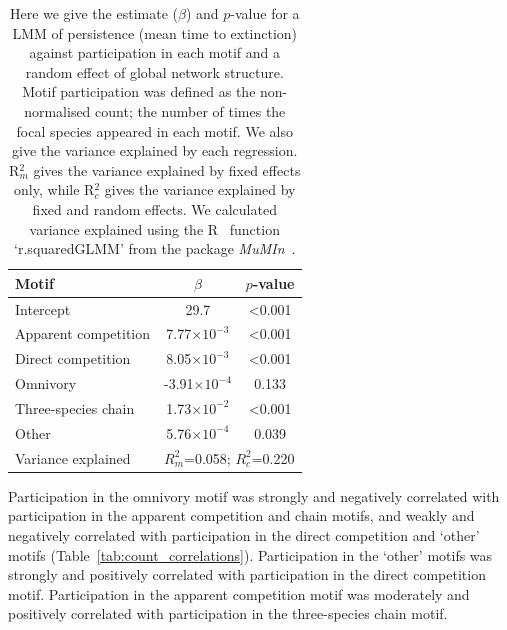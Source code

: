 \documentclass[12pt]{article}
\begin{document}
		\begin{table}[hb!]
    		\caption{Here we give the estimate ($\beta$) and $p$-value for a LMM of persistence (mean time to extinction) against participation in each motif and a random effect of global network structure. Motif participation was defined as the non-normalised count; the number of times the focal species appeared in each motif. We also give the variance explained by each regression. R$^{2}_{m}$ gives the variance explained by fixed effects only, while R$^{2}_{c}$ gives the variance explained by fixed and random effects. We calculated variance explained using the R~\citep{R} function `r.squaredGLMM' from the package \emph{MuMIn}~\citep{MuMIn}.}
    		\label{tab:persistence_motifs}
    		\begin{tabular}{l | c c}
    		 Motif & $\beta$ & $p$-value \\  
    		 \hline
    		 Intercept & 29.7 & \textless0.001 \\
    		 \hline
    		 Apparent competition & 7.77$\times10^{-3}$ & \textless0.001 \\
    		 Direct competition & 8.05$\times10^{-3}$ & \textless0.001 \\
    		 Omnivory &  -3.91$\times10^{-4}$ & 0.133 \\
    		 Three-species chain &  1.73$\times10^{-2}$ & \textless0.001 \\
    		 Other &  5.76$\times10^{-4}$ & 0.039 \\
    		 \hline
    		 Variance explained & \multicolumn{2}{c}{$R^{2}_m$=0.058; $R^2_c$=0.220} \\
    		 \hline
    		 \end{tabular}
    		 \end{table}
    

		Participation in the omnivory motif was strongly and negatively correlated with participation in the apparent competition and chain motifs, and weakly and negatively correlated with participation in the direct competition and `other' motifs (Table~\ref{tab:count_correlations}).
		Participation in the `other' motifs was strongly and positively correlated with participation in the direct competition motif.
		Participation in the apparent competition motif was moderately and positively correlated with participation in the three-species chain motif.
\end{document}
